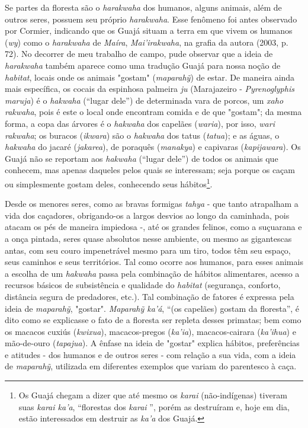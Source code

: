 Se partes da floresta são o \emph{harakwaha} dos humanos, alguns
animais, além de outros seres, possuem seu próprio \emph{harakwaha}.
Esse fenômeno foi antes observado por Cormier, indicando que os Guajá
situam a terra em que vivem os humanos (\emph{wy}) como o
\emph{harakwaha} de \emph{Maíra}, \emph{Mai'irakwaha}, na grafia da
autora (2003, p. 72). No decorrer de meu trabalho de campo, pude
observar que a ideia de \emph{harakwaha} também aparece como uma
tradução Guajá para nossa noção de \emph{habitat}, locais onde os
animais "gostam" (\emph{maparahỹ}) de estar. De maneira ainda mais
específica, os cocais da espinhosa palmeira \emph{ju} (Marajazeiro -
\emph{Pyrenoglyphis maruja}) é o \emph{hakwaha} (``lugar dele'') de
determinada vara de porcos, um \emph{xaho rakwaha}, pois é este o local
onde encontram comida e de que "gostam"; da mesma forma, a copa das
árvores é o \emph{hakwaha} dos capelães (\emph{waria}), por isso,
\emph{wari rakwaha}; os buracos (\emph{ikwara}) são o \emph{hakwaha} dos
tatus (\emph{tatua}); e as águas, o \emph{hakwaha} do jacaré
(\emph{jakarea}), de poraquês (\emph{manakya}) e capivaras
(\emph{kapijawara}). Os Guajá não se reportam aos \emph{hakwaha}
(``lugar dele'') de todos os animais que conhecem, mas apenas daqueles
pelos quais se interessam; seja porque os caçam ou simplesmente gostam
deles, conhecendo seus hábitos\footnote{Os Guajá chegam a dizer que até
  mesmo os \emph{karai} (não-indígenas) tiveram suas \emph{karai ka'a},
  ``florestas dos \emph{karai} '', porém as destruíram e, hoje em dia,
  estão interessados em destruir as \emph{ka'a} dos Guajá.}.

Desde os menores seres, como as bravas formigas \emph{tahya} - que tanto
atrapalham a vida dos caçadores, obrigando-os a largos desvios ao longo
da caminhada, pois atacam os pés de maneira impiedosa -, até os grandes
felinos, como a suçuarana e a onça pintada, seres quase absolutos nesse
ambiente, ou mesmo as gigantescas antas, com seu couro impenetrável
mesmo para um tiro, todos têm seu espaço, seus caminhos e seus
territórios. Tal como ocorre aos humanos, para esses animais a escolha
de um \emph{hakwaha} passa pela combinação de hábitos alimentares,
acesso a recursos básicos de subsistência e qualidade do \emph{habitat}
(segurança, conforto, distância segura de predadores, etc.). Tal
combinação de fatores é expressa pela ideia de \emph{maparahỹ},
"gostar". \emph{Maparahỹ ka'á}, ``(os capelães) gostam da floresta'', é
dito como se explicasse o fato de a floresta ser repleta desses
primatas; bem como os macacos cuxiús (\emph{kwixua}), macacos-pregos
(\emph{ka'ia}), macacos-cairara (\emph{ka'ihua}) e mão-de-ouro
(\emph{tapajua}). A ênfase na ideia de "gostar" explica hábitos,
preferências e atitudes - dos humanos e de outros seres - com relação a
sua vida, com a ideia de \emph{maparahỹ}, utilizada em diferentes
exemplos que variam do parentesco à caça.

